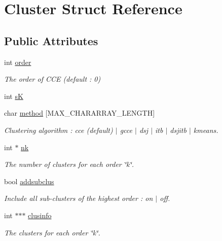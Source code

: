 \hypertarget{structCluster}{\section{Cluster Struct Reference}
\label{structCluster}
}
\subsection*{Public Attributes}
\begin{DoxyCompactItemize}
\item 
int \hyperlink{structCluster_ae77394af156e2e278a34f12e83d66cb7}{order}
\begin{DoxyCompactList}\small\item\em The order of C\-C\-E (default \-: 0) \end{DoxyCompactList}\item 
int \hyperlink{structCluster_a7c4d583750b7f37eb2ca537e23ad334f}{s\-K}
\item 
char \hyperlink{structCluster_acfc81556c4ed78e0bce4c36119fe7150}{method} \mbox{[}M\-A\-X\-\_\-\-C\-H\-A\-R\-A\-R\-R\-A\-Y\-\_\-\-L\-E\-N\-G\-T\-H\mbox{]}
\begin{DoxyCompactList}\small\item\em Clustering algorithm \-: cce (default) $|$ gcce $|$ dsj $|$ itb $|$ dsjitb $|$ kmeans. \end{DoxyCompactList}\item 
int $\ast$ \hyperlink{structCluster_a1385a76b03a7f2f862526ff2bf449755}{nk}
\begin{DoxyCompactList}\small\item\em The number of clusters for each order \char`\"{}k\char`\"{}. \end{DoxyCompactList}\item 
bool \hyperlink{structCluster_a33621fac416bdd2eea40805e74730748}{addsubclus}
\begin{DoxyCompactList}\small\item\em Include all sub-\/clusters of the highest order \-: on $|$ off. \end{DoxyCompactList}\item 
int $\ast$$\ast$$\ast$ \hyperlink{structCluster_afd65bde6cf52f123d1d1ab7a3fd9805c}{clusinfo}
\begin{DoxyCompactList}\small\item\em The clusters for each order \char`\"{}k\char`\"{}. \end{DoxyCompactList}\end{DoxyCompactItemize}


